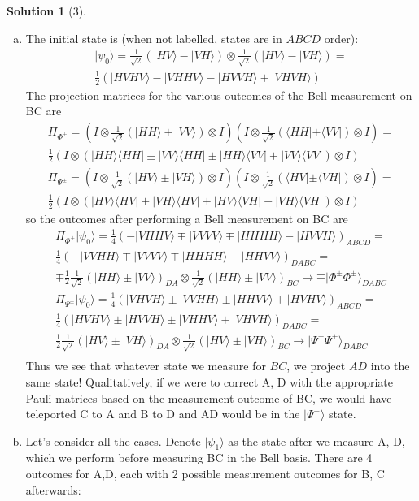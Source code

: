 \documentclass[11pt]{article}
\theoremstyle{definition}
\newtheorem*{solution}{Solution}
\newcommand{\eq}{\begin{equation}\begin{aligned}}
\newcommand{\qe}{\end{aligned}\end{equation}}
\newcommand{\bra}[1]{\langle #1|}
\newcommand{\ket}[1]{|#1\rangle}
\begin{document}
\begin{solution}[3]
\begin{enumerate}[(a)]
    \item The initial state is (when not labelled, states are in $ABCD$ order):
    \eq
      \ket{\psi_0}=\frac{1}{\sqrt{2}}(\ket{HV}-\ket{VH})\otimes \frac{1}{\sqrt{2}}(\ket{HV}-\ket{VH})=\\
      \frac{1}{2}(\ket{HVHV}-\ket{VHHV}-\ket{HVVH}+\ket{VHVH})
    \qe
    The projection matrices for the various outcomes of the Bell measurement on BC are
    \eq
      \Pi_{\Phi^{\pm}}=(I\otimes \frac{1}{\sqrt{2}}(\ket{HH}\pm\ket{VV})\otimes I) (I\otimes \frac{1}{\sqrt{2}}(\bra{HH}\pm\bra{VV})\otimes I)=\\
      \frac{1}{2}(I\otimes (\ket{HH}\bra{HH}\pm\ket{VV}\bra{HH}\pm\ket{HH}\bra{VV}+\ket{VV}\bra{VV})\otimes I)\\
      \Pi_{\Psi^{\pm}}=(I\otimes \frac{1}{\sqrt{2}}(\ket{HV}\pm\ket{VH})\otimes I) (I\otimes \frac{1}{\sqrt{2}}(\bra{HV}\pm\bra{VH})\otimes I)=\\
      \frac{1}{2}(I\otimes (\ket{HV}\bra{HV}\pm\ket{VH}\bra{HV}\pm\ket{HV}\bra{VH}+\ket{VH}\bra{VH})\otimes I)
    \qe
    so the outcomes after performing a Bell measurement on BC are
    \eq
      \Pi_{\Phi^{\pm}}\ket{\psi_0}=\frac{1}{4}(-\ket{VHHV}\mp\ket{VVVV}\mp\ket{HHHH}-\ket{HVVH})_{ABCD}=\\ 
      \frac{1}{4}(-\ket{VVHH}\mp\ket{VVVV}\mp\ket{HHHH}-\ket{HHVV})_{DABC}=\\
      \mp\frac{1}{2}\frac{1}{\sqrt{2}}(\ket{HH}\pm\ket{VV})_{DA}\otimes \frac{1}{\sqrt{2}}(\ket{HH}\pm\ket{VV})_{BC}\to\boxed{\mp\ket{\Phi^{\pm}\Phi^{\pm}}_{DABC}}\\
      \Pi_{\Psi^{\pm}}\ket{\psi_0}=\frac{1}{4}(\ket{VHVH}\pm\ket{VVHH}\pm\ket{HHVV}+\ket{HVHV})_{ABCD}=\\ 
      \frac{1}{4}(\ket{HVHV}\pm\ket{HVVH}\pm\ket{VHHV}+\ket{VHVH})_{DABC}=\\
      \frac{1}{2}\frac{1}{\sqrt{2}}(\ket{HV}\pm\ket{VH})_{DA}\otimes \frac{1}{\sqrt{2}}(\ket{HV}\pm\ket{VH})_{BC}\to\boxed{\ket{\Psi^{\pm}\Psi^{\pm}}_{DABC}}\\
    \qe
    Thus we see that whatever state we measure for $BC$, we project $AD$ into the same state! Qualitatively, if we were to correct A, D with the appropriate Pauli matrices based on the measurement outcome of BC, we would have teleported C to A and B to D and AD would be in the $\ket{\Psi^-}$ state.
    \item Let's consider all the cases. Denote $\ket{\psi_1}$ as the state after we measure A, D, which we perform before measuring BC in the Bell basis. There are 4 outcomes for A,D, each with 2 possible measurement outcomes for B, C afterwards:

\end{enumerate}
\end{solution}
\end{document}
